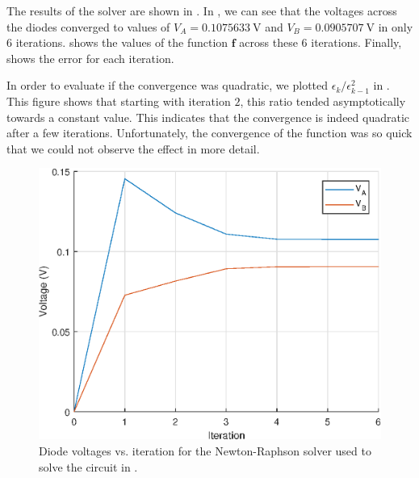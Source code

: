 \documentclass[journal,hidelinks]{IEEEtran}
\begin{document}
The results of the solver are shown in . In , we can see that the voltages across the diodes converged to values of $V_A = \SI{0.1075633}{\volt}$ and $V_B = \SI{0.0905707}{\volt}$ in only $6$ iterations.  shows the values of the function $\boldsymbol{f}$ across these $6$ iterations. Finally,  shows the error for each iteration.

In order to evaluate if the convergence was quadratic, we plotted $\epsilon_k / \epsilon_{k-1}^2$ in . This figure shows that starting with iteration $2$, this ratio tended asymptotically towards a constant value. This indicates that the convergence is indeed quadratic after a few iterations. Unfortunately, the convergence of the function was so quick that we could not observe the effect in more detail.

\begin{figure}[!htb]
  \centering
  \includegraphics[width=\columnwidth]{question-3/voltages.eps}
  \caption{Diode voltages vs. iteration for the Newton-Raphson solver used to solve the circuit in .}
  \label{fig:q3-voltages}
\end{figure}
\end{document}
